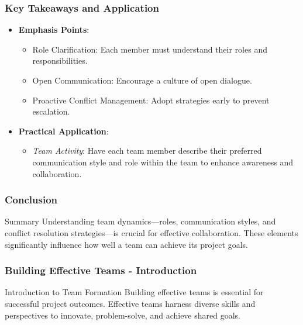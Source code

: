 \documentclass[aspectratio=169]{beamer}
\begin{document}
\begin{frame}[fragile]
    \frametitle{Key Takeaways and Application}
    \begin{itemize}
        \item \textbf{Emphasis Points}:
        \begin{itemize}
            \item Role Clarification: Each member must understand their roles and responsibilities.
            \item Open Communication: Encourage a culture of open dialogue.
            \item Proactive Conflict Management: Adopt strategies early to prevent escalation.
        \end{itemize}
        \item \textbf{Practical Application}:
        \begin{itemize}
            \item \textit{Team Activity}: Have each team member describe their preferred communication style and role within the team to enhance awareness and collaboration.
        \end{itemize}
    \end{itemize}
\end{frame}

\begin{frame}[fragile]
    \frametitle{Conclusion}
    \begin{block}{Summary}
        Understanding team dynamics—roles, communication styles, and conflict resolution strategies—is crucial for effective collaboration. These elements significantly influence how well a team can achieve its project goals.
    \end{block}
\end{frame}

\begin{frame}[fragile]
    \frametitle{Building Effective Teams - Introduction}
    \begin{block}{Introduction to Team Formation}
        Building effective teams is essential for successful project outcomes. Effective teams harness diverse skills and perspectives to innovate, problem-solve, and achieve shared goals.
    \end{block}
\end{frame}
\end{document}
